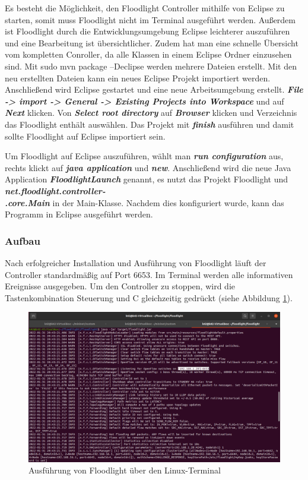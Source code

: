 \documentclass[fontsize=12pt,paper=a4,open=any,parskip=half,
  twoside=false,toc=listof,toc=bibliography,fleqn,leqno,
  captions=nooneline,captions=tableabove,british]{scrbook}
\begin{document}
Es besteht die Möglichkeit, den Floodlight Controller mithilfe von Eclipse zu starten, somit muss Floodlight nicht im Terminal ausgeführt werden. Außerdem ist Floodlight durch die Entwicklungsumgebung Eclipse leichterer auszuführen und eine Bearbeitung ist übersichtlicher. Zudem hat man eine schnelle Übersicht vom kompletten Conroller, da alle Klassen in einem Eclipse Ordner einzusehen sind. Mit sudo mvn package –Declipse werden mehrere Dateien erstellt. Mit den neu erstellten Dateien kann ein neues Eclipse Projekt importiert werden. Anschließend wird Eclipse gestartet und eine neue Arbeitsumgebung erstellt. \textit{\textbf{File -> import -> General -> Existing Projects into Workspace}} und auf \textit{\textbf{Next}} klicken. Von \textit{\textbf{Select root directory}} auf \textit{\textbf{Browser}} klicken und Verzeichnis das Floodlight enthält auswählen. Das Projekt mit \textit{\textbf{finish}} ausführen und damit sollte Floodlight auf Eclipse importiert sein.\par
Um Floodlight auf Eclipse auszuführen, wählt man \textit{\textbf{run configuration}} aus, rechts klickt auf \textit{\textbf{java application}} und \textit{\textbf{new}}. Anschließend wird die neue Java Application \textit{\textbf{FloodlightLaunch}} genannt, es nutzt das Projekt Floodlight und \textit{\textbf{net.floodlight.controller-\\.core.Main}} in der Main-Klasse. Nachdem dies konfiguriert wurde, kann das Programm in Eclipse ausgeführt werden.


\subsubsection{Aufbau}
Nach erfolgreicher Installation und Ausführung von Floodlight läuft der Controller standardmäßig auf Port 6653. Im Terminal werden alle informativen Ereignisse ausgegeben. Um den Controller zu stoppen, wird die Tastenkombination Steuerung und C gleichzeitig gedrückt (siehe Abbildung \ref{floodlight}).

\begin{figure}[H]
 \centering
 \includegraphics[width=1.0\textwidth]{Bilder/floodlight}
 \captionsetup{justification=centering,margin=1cm}
 \caption{Ausführung von Floodlight über den Linux-Terminal}
 \label{floodlight}
\end{figure}
\end{document}
